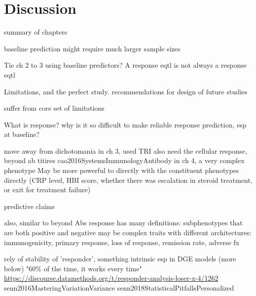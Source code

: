 %
%

\chapter{Discussion}

\begin{outline}

summary of chapters

    baseline prediction might require much larger sample sizes

    Tie ch 2 to 3 using baseline predictors?
    A response eqtl is not always a response eqtl

    Limitations, and the perfect study.
        recommendations for design of future studies

    suffer from core set of limitations 

What is response?
    why is it so difficult to make reliable response prediction, esp at baseline?

    move away from dichotomania
        in ch 3, used TRI
            also need the cellular response, beyond ab titires cao2016SystemsImmunologyAntibody
        in ch 4, 
            a very complex phenotype
            May be more powerful to directly with the constituent phenotypes directly (CRP level, HBI score, whether there was escalation in steroid treatment, or exit for treatment failure)

            predictive claims

            also, similar to beyond Abs
            response has many definitions: subphenotypes that are both positive and negative may be complex traits with different architectures: immunogenicity, primary response, loss of response, remission rate, adverse fx

    rely of stability of 'responder', something intrinsic
        esp in DGE models (more below)
    "60\% of the time, it works every time"
        \url{https://discourse.datamethods.org/t/responder-analysis-loser-x-4/1262}
        senn2016MasteringVariationVariance
        senn2018StatisticalPitfallsPersonalized


\end{outline}
